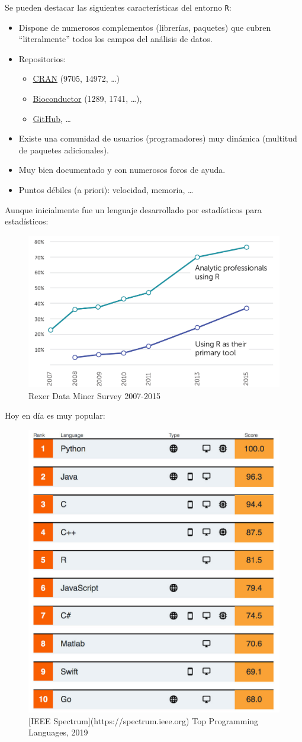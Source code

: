 \documentclass[]{book}
\begin{document}
Se pueden destacar las siguientes características del entorno
\texttt{R}:

\begin{itemize}
\item
  Dispone de numerosos complementos (librerías, paquetes) que cubren
  ``literalmente'' todos los campos del análisis de datos.
\item
  Repositorios:

  \begin{itemize}
  \item
    \href{https://cran.r-project.org}{CRAN} (9705, 14972, \ldots{})
  \item
    \href{https://www.bioconductor.org}{Bioconductor} (1289, 1741,
    \ldots{}),
  \item
    \href{https://github.com/trending/r?since=monthly}{GitHub}, \ldots{}
  \end{itemize}
\item
  Existe una comunidad de usuarios (programadores) muy dinámica
  (multitud de paquetes adicionales).
\item
  Muy bien documentado y con numerosos foros de ayuda.
\item
  Puntos débiles (a priori): velocidad, memoria, \ldots{}
\end{itemize}

Aunque inicialmente fue un lenguaje desarrollado por estadísticos para
estadísticos:

\begin{figure}[!htb]

{\centering \includegraphics[width=0.4\linewidth]{figuras/rexer2016} 

}

\caption{Rexer Data Miner Survey 2007-2015}\label{fig:rexer}
\end{figure}

Hoy en día es muy popular:

\begin{figure}[!htb]

{\centering \includegraphics[width=0.35\linewidth]{figuras/IEEE-top-programming-languages-of-2019} 

}

\caption{[IEEE Spectrum](https://spectrum.ieee.org) Top Programming Languages, 2019}\label{fig:ieee}
\end{figure}
\end{document}
